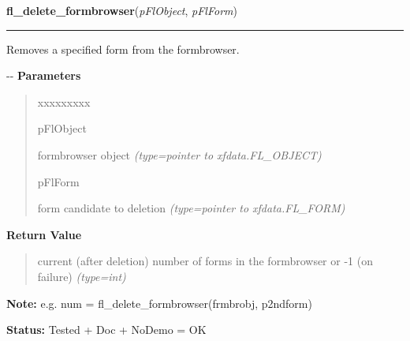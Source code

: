     \label{xformslib:flformbrowser:fl_delete_formbrowser}

    \vspace{0.5ex}

\hspace{.8\funcindent}\begin{boxedminipage}{\funcwidth}

    \raggedright \textbf{fl\_delete\_formbrowser}(\textit{pFlObject}, \textit{pFlForm})

    \vspace{-1.5ex}

    \rule{\textwidth}{0.5\fboxrule}
\setlength{\parskip}{2ex}

Removes a specified form from the formbrowser.

-{}-
\setlength{\parskip}{1ex}
      \textbf{Parameters}
      \vspace{-1ex}

      \begin{quote}
        \begin{Ventry}{xxxxxxxxx}

          \item[pFlObject]


formbrowser object
            {\it (type=pointer to xfdata.FL\_OBJECT)}

          \item[pFlForm]


form candidate to deletion
            {\it (type=pointer to xfdata.FL\_FORM)}

        \end{Ventry}

      \end{quote}

      \textbf{Return Value}
    \vspace{-1ex}

      \begin{quote}

current (after deletion) number of forms in the formbrowser
or -1 (on failure)
      {\it (type=int)}

      \end{quote}

\textbf{Note:} 
e.g. num = fl\_delete\_formbrowser(frmbrobj, p2ndform)


\textbf{Status:} 
Tested + Doc + NoDemo = OK


    \end{boxedminipage}

